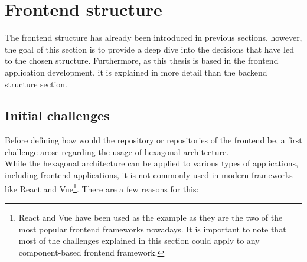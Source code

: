 \documentclass[../design.tex]{subfiles}
\begin{document}
\section{Frontend structure}
The frontend structure has already been introduced in previous sections,
however, the goal of this section is to provide a deep dive into the decisions
that have led to the chosen structure. Furthermore, as this thesis is based in
the frontend application development, it is explained in more detail than the
backend structure section.
\subsection{Initial challenges}
Before defining how would the repository or repositories of the frontend be, a
first challenge arose regarding the usage of hexagonal architecture.
\\
While the hexagonal architecture can be applied to various types of
applications, including frontend applications, it is not commonly used in modern
frameworks like React and Vue\footnote{React and Vue have been used as the
	example as they are the two of the most popular frontend frameworks nowadays. It
	is important to note that most of the challenges explained in this section could
	apply to any component-based frontend framework.}. There are a few reasons for
this:
\end{document}
